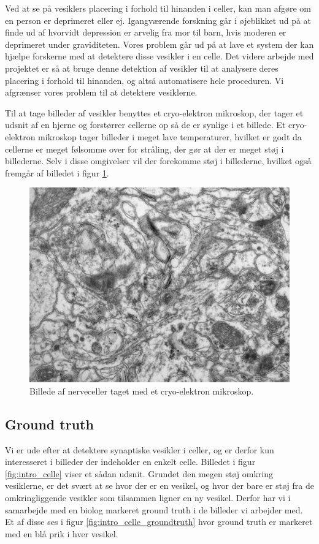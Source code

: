Ved at se på vesiklers placering i forhold til hinanden i celler, kan man afgøre om en person er deprimeret eller ej. Igangværende forskning går i øjeblikket ud på at finde ud af hvorvidt depression er arvelig fra mor til barn, hvis moderen er deprimeret under graviditeten. Vores problem går ud på at lave et system der kan hjælpe forskerne med at detektere disse vesikler i en celle. Det videre arbejde med projektet er så at bruge denne detektion af vesikler til at analysere deres placering i forhold til hinanden, og altså automatisere hele proceduren. Vi afgrænser vores problem til at detektere vesiklerne.

Til at tage billeder af vesikler benyttes et cryo-elektron mikroskop, der tager et udsnit af en hjerne og forstørrer cellerne op så de er synlige i et billede. Et cryo-elektron mikroskop tager billeder i meget lave temperaturer, hvilket er godt da cellerne er meget følsomme over for stråling, der gør at der er meget støj i billederne. Selv i disse omgivelser vil der forekomme støj i billederne, hvilket også fremgår af billedet i figur \ref{fig:intro_celler}.

\begin{figure}[H]
	\centering
	\includegraphics[scale=0.5]{files/intro/img/celler.jpg}
	\caption{Billede af nerveceller taget med et cryo-elektron mikroskop.\label{fig:intro_celler}}
\end{figure}

\subsection{Ground truth}
Vi er ude efter at detektere synaptiske vesikler i celler, og er derfor kun interesseret i billeder der indeholder en enkelt celle. Billedet i figur \ref{fig:intro_celle} viser et sådan udsnit. Grundet den megen støj omkring vesiklerne, er det svært at se hvor der er en vesikel, og hvor der bare er støj fra de omkringliggende vesikler som tilsammen ligner en ny vesikel. Derfor har vi i samarbejde med en biolog markeret ground truth i de billeder vi arbejder med. Et af disse ses i figur \ref{fig:intro_celle_groundtruth} hvor ground truth er markeret med en blå prik i hver vesikel.

